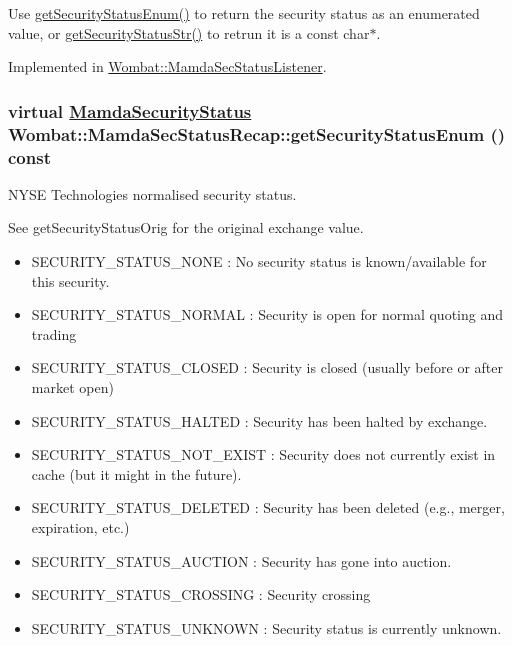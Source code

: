Use \hyperlink{classWombat_1_1MamdaSecStatusRecap_79969c1a88df2ff54d7746876cebb653}{get\-Security\-Status\-Enum()} to return the security status as an enumerated value, or \hyperlink{classWombat_1_1MamdaSecStatusRecap_4f195cb017b796ba8d82cd3c3b1c1504}{get\-Security\-Status\-Str()} to retrun it is a const char$\ast$. 

Implemented in \hyperlink{classWombat_1_1MamdaSecStatusListener_b1b6d523017888af27f4c3745c2e7fc0}{Wombat::Mamda\-Sec\-Status\-Listener}.\hypertarget{classWombat_1_1MamdaSecStatusRecap_79969c1a88df2ff54d7746876cebb653}{
\subsubsection[getSecurityStatusEnum]{\setlength{\rightskip}{0pt plus 5cm}virtual \hyperlink{namespaceWombat_073e683b7aeffa26cf3d2791dda32b4b}{Mamda\-Security\-Status} Wombat::Mamda\-Sec\-Status\-Recap::get\-Security\-Status\-Enum () const}}
\label{classWombat_1_1MamdaSecStatusRecap_79969c1a88df2ff54d7746876cebb653}


NYSE Technologies normalised security status. 

See get\-Security\-Status\-Orig for the original exchange value.

\begin{itemize}
\item SECURITY\_\-STATUS\_\-NONE : No security status is known/available for this security. \item SECURITY\_\-STATUS\_\-NORMAL : Security is open for normal quoting and trading \item SECURITY\_\-STATUS\_\-CLOSED : Security is closed (usually before or after market open) \item SECURITY\_\-STATUS\_\-HALTED : Security has been halted by exchange. \item SECURITY\_\-STATUS\_\-NOT\_\-EXIST : Security does not currently exist in cache (but it might in the future). \item SECURITY\_\-STATUS\_\-DELETED : Security has been deleted (e.g., merger, expiration, etc.)  \item SECURITY\_\-STATUS\_\-AUCTION : Security has gone into auction. \item SECURITY\_\-STATUS\_\-CROSSING : Security crossing \item SECURITY\_\-STATUS\_\-UNKNOWN : Security status is currently unknown. \end{itemize}


